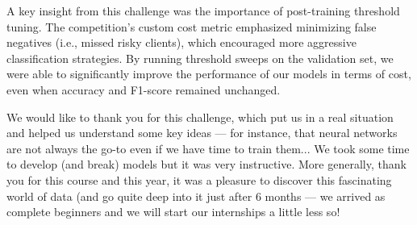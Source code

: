\documentclass[12pt]{report}
\begin{document}
A key insight from this challenge was the importance of post-training threshold tuning. The competition’s custom cost metric emphasized minimizing false negatives (i.e., missed risky clients), which encouraged more aggressive classification strategies. By running threshold sweeps on the validation set, we were able to significantly improve the performance of our models in terms of cost, even when accuracy and F1-score remained unchanged.

We would like to thank you for this challenge, which put us in a real situation and helped us understand some key ideas — for instance, that neural networks are not always the go-to even if we have time to train them... We took some time to develop (and break) models but it was very instructive. More generally, thank you for this course and this year, it was a pleasure to discover this fascinating world of data (and go quite deep into it just after 6 months — we arrived as complete beginners and we will start our internships a little less so!
\end{document}
